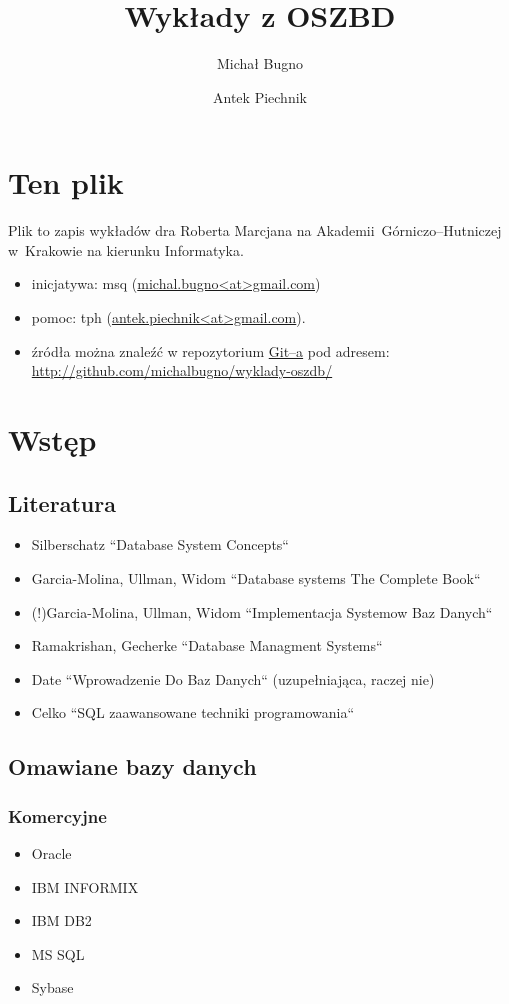 \documentclass[12pt]{article}
\author{Michał Bugno \and Antek Piechnik}
\title{Wykłady z OSZBD}
\begin{document}
\maketitle
\tableofcontents
\newpage

\section{Ten plik}
Plik to zapis wykładów dra Roberta Marcjana na Akademii~Górniczo--Hutniczej
w~Krakowie na kierunku Informatyka.
\begin{itemize}
\item inicjatywa: msq (\url{michal.bugno<at>gmail.com})
\item pomoc: tph (\url{antek.piechnik<at>gmail.com}).
\item źródła można znaleźć w repozytorium \href{http://git.or.cz/}{Git--a}
      pod adresem:\\ \url{http://github.com/michalbugno/wyklady-oszdb/}
\end{itemize}

\section{Wstęp}
\subsection{Literatura}
\begin{itemize}
\item Silberschatz ``Database System Concepts``
\item Garcia-Molina, Ullman, Widom ``Database systems The Complete Book``
\item (!)Garcia-Molina, Ullman, Widom ``Implementacja Systemow Baz Danych``
\item Ramakrishan, Gecherke ``Database Managment Systems``
\item Date ``Wprowadzenie Do Baz Danych`` (uzupełniająca, raczej nie)
\item Celko ``SQL zaawansowane techniki programowania``
\end{itemize}

\subsection{Omawiane bazy danych}
\subsubsection{Komercyjne}
\begin{itemize}
\item Oracle
\item IBM INFORMIX
\item IBM DB2
\item MS SQL
\item Sybase
\end{itemize}
\end{document}
